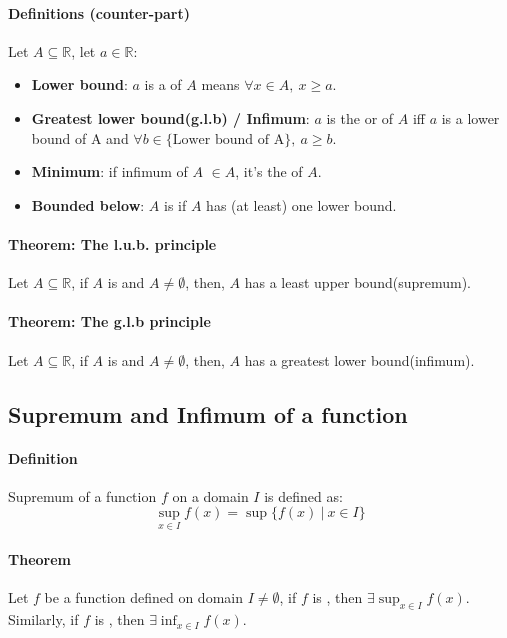 \documentclass{article}
\begin{document}
	\paragraph{Definitions (counter-part)} Let $A \subseteq \mathbb{R}$, let $a \in \mathbb{R}$:
	\begin{itemize}
		\item \textbf{Lower bound}: $a$ is a  of $A$ means $\forall x \in A,\  x \geq a$.
		\item \textbf{Greatest lower bound(g.l.b) / Infimum}: $a$ is the  or  of $A$ iff $a$ is a lower bound of A and $\forall b \in \{\text{Lower bound of A}\},\ a \geq b$.
		\item \textbf{Minimum}: if infimum of $A$ $\in A$, it's the  of $A$.
		\item \textbf{Bounded below}: $A$ is  if $A$ has (at least) one lower bound.
	\end{itemize}
	\paragraph{Theorem: The l.u.b. principle} Let $A \subseteq \mathbb{R}$, if $A$ is  and $A \neq \emptyset$, then, $A$ has a least upper bound(supremum).
	\paragraph{Theorem: The g.l.b principle} Let $A \subseteq \mathbb{R}$, if $A$ is  and $A \neq \emptyset$, then, $A$ has a greatest lower bound(infimum).
	\subsection{Supremum and Infimum of a function}
	\paragraph{Definition} Supremum of a function $f$ on a domain $I$ is defined as:
	\[
	\sup_{x \in I} f(x) =  \sup\{f(x) \ \vert\  x \in I\}
	\]
	\paragraph{Theorem} Let $f$ be a function defined on domain $I \neq \emptyset$, if $f$ is , then $\exists \sup_{x \in I}f(x)$. Similarly, if $f$ is , then $\exists \inf_{x \in I}f(x)$.
\end{document}
